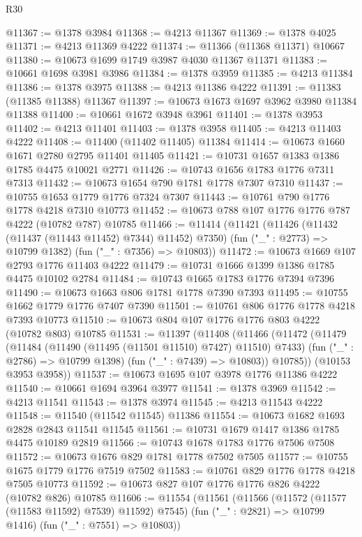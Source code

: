 \begin{lexlean}{R30}
\begin{coremodule}
{{{{{@11367 := @1378 @3984
@11368 := @4213 @11367
@11369 := @1378 @4025
@11371 := @4213 @11369 @4222
@11374 := @11366 (@11368 @11371) @10667
@11380 := @10673 @1699 @1749 @3987 @4030 @11367 @11371
@11383 := @10661 @1698 @3981 @3986
@11384 := @1378 @3959
@11385 := @4213 @11384
@11386 := @1378 @3975
@11388 := @4213 @11386 @4222
@11391 := @11383 (@11385 @11388) @11367
@11397 := @10673 @1673 @1697 @3962 @3980 @11384 @11388
@11400 := @10661 @1672 @3948 @3961
@11401 := @1378 @3953
@11402 := @4213 @11401
@11403 := @1378 @3958
@11405 := @4213 @11403 @4222
@11408 := @11400 (@11402 @11405) @11384
@11414 := @10673 @1660 @1671 @2780 @2795 @11401 @11405
@11421 := @10731 @1657 @1383 @1386 @1785 @4475 @10021 @2771
@11426 := @10743 @1656 @1783 @1776 @7311 @7313
@11432 := @10673 @1654 @790 @1781 @1778 @7307 @7310
@11437 := @10755 @1653 @1779 @1776 @7324 @7307
@11443 := @10761 @790 @1776 @1778 @4218 @7310 @10773
@11452 := @10673 @788 @107 @1776 @1776 @787 @4222 (@10782 @787) @10785
@11466 := @11414
    (@11421
      (@11426 (@11432 (@11437 (@11443 @11452) @7344) @11452) @7350)
      (fun ("_" : @2773) => @10799 @1382)
      (fun ("_" : @7356) => @10803))
@11472 := @10673 @1669 @107 @2793 @1776 @11403 @4222
@11479 := @10731 @1666 @1399 @1386 @1785 @4475 @10102 @2784
@11484 := @10743 @1665 @1783 @1776 @7394 @7396
@11490 := @10673 @1663 @806 @1781 @1778 @7390 @7393
@11495 := @10755 @1662 @1779 @1776 @7407 @7390
@11501 := @10761 @806 @1776 @1778 @4218 @7393 @10773
@11510 := @10673 @804 @107 @1776 @1776 @803 @4222 (@10782 @803) @10785
@11531 := @11397
    (@11408
      (@11466
        (@11472
          (@11479
            (@11484 (@11490 (@11495 (@11501 @11510) @7427) @11510) @7433)
            (fun ("_" : @2786) => @10799 @1398)
            (fun ("_" : @7439) => @10803))
          @10785))
      (@10153 @3953 @3958))
@11537 := @10673 @1695 @107 @3978 @1776 @11386 @4222
@11540 := @10661 @1694 @3964 @3977
@11541 := @1378 @3969
@11542 := @4213 @11541
@11543 := @1378 @3974
@11545 := @4213 @11543 @4222
@11548 := @11540 (@11542 @11545) @11386
@11554 := @10673 @1682 @1693 @2828 @2843 @11541 @11545
@11561 := @10731 @1679 @1417 @1386 @1785 @4475 @10189 @2819
@11566 := @10743 @1678 @1783 @1776 @7506 @7508
@11572 := @10673 @1676 @829 @1781 @1778 @7502 @7505
@11577 := @10755 @1675 @1779 @1776 @7519 @7502
@11583 := @10761 @829 @1776 @1778 @4218 @7505 @10773
@11592 := @10673 @827 @107 @1776 @1776 @826 @4222 (@10782 @826) @10785
@11606 := @11554
    (@11561
      (@11566 (@11572 (@11577 (@11583 @11592) @7539) @11592) @7545)
      (fun ("_" : @2821) => @10799 @1416)
      (fun ("_" : @7551) => @10803))
}}}}}
\end{coremodule}
\end{lexlean}
